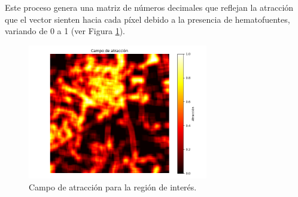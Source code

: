Este proceso genera una matriz de números decimales que reflejan la atracción que el vector sienten hacia cada píxel debido a la presencia de hematofuentes, variando de 0 a 1 (ver Figura \ref{fig:atraccion}).

\begin{figure}[H]
	\includegraphics[width=0.7\textwidth]{campoDeAtraccion.png}
	\centering
	\caption{Campo de atracción para la región de interés.}
	\label{fig:atraccion}
\end{figure}

